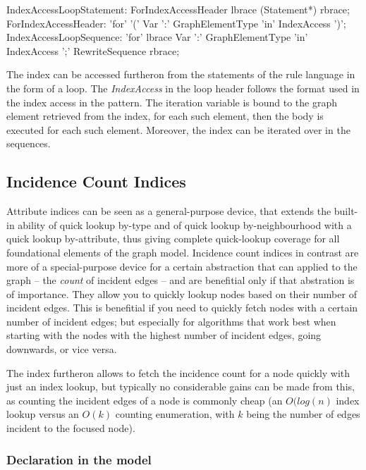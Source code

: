 \begin{rail}
  IndexAccessLoopStatement:
    ForIndexAccessHeader lbrace (Statement*) rbrace;
  ForIndexAccessHeader:
    'for' '(' Var ':' GraphElementType 'in' IndexAccess ')';
  IndexAccessLoopSequence:
    'for' lbrace Var ':' GraphElementType 'in' IndexAccess ';' RewriteSequence rbrace;
\end{rail}

The index can be accessed furtheron from the statements of the rule language in the form of a loop.
The \emph{IndexAccess} in the loop header follows the format used in the index access in the pattern.
The iteration variable is bound to the graph element retrieved from the index, for each such element, then the body is executed for each such element.
Moreover, the index can be iterated over in the sequences.

\subsection{Incidence Count Indices}
Attribute indices can be seen as a general-purpose device, that extends the built-in ability of quick lookup by-type and of quick lookup by-neighbourhood with a quick lookup by-attribute, thus giving complete quick-lookup coverage for all foundational elements of the graph model.
Incidence count indices in contrast are more of a special-purpose device for a certain abstraction that can applied to the graph -- the \emph{count} of incident edges -- and are benefitial only if that abstration is of importance.
They allow you to quickly lookup nodes based on their number of incident edges.
This is benefitial if you need to quickly fetch nodes with a certain number of incident edges;
but especially for algorithms that work best when starting with the nodes with the highest number of incident edges, going downwards, or vice versa.

The index furtheron allows to fetch the incidence count for a node quickly with just an index lookup, 
but typically no considerable gains can be made from this, as counting the incident edges of a node is commonly cheap (an $O(log(n)$ index lookup versus an $O(k)$ counting enumeration, with $k$ being the number of edges incident to the focused node).

\subsubsection*{Declaration in the model}

